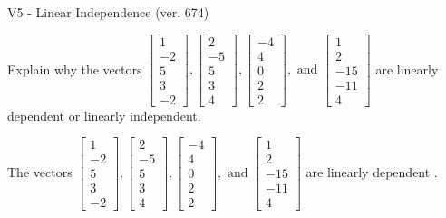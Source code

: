 \begin{exercise}
  \begin{exerciseTitle}V5 - Linear Independence (ver. 674)\end{exerciseTitle}
  \begin{exerciseStatement}
    Explain why the vectors \(\left[\begin{array}{r}
1 \\
-2 \\
5 \\
3 \\
-2
\end{array}\right] , \left[\begin{array}{r}
2 \\
-5 \\
5 \\
3 \\
4
\end{array}\right] , \left[\begin{array}{r}
-4 \\
4 \\
0 \\
2 \\
2
\end{array}\right] , \text{ and } \left[\begin{array}{r}
1 \\
2 \\
-15 \\
-11 \\
4
\end{array}\right]\) are linearly dependent or linearly independent.	


  \end{exerciseStatement}
  \begin{exerciseAnswer}
   The vectors \(\left[\begin{array}{r}
1 \\
-2 \\
5 \\
3 \\
-2
\end{array}\right] , \left[\begin{array}{r}
2 \\
-5 \\
5 \\
3 \\
4
\end{array}\right] , \left[\begin{array}{r}
-4 \\
4 \\
0 \\
2 \\
2
\end{array}\right] , \text{ and } \left[\begin{array}{r}
1 \\
2 \\
-15 \\
-11 \\
4
\end{array}\right]\) are 
  	 linearly dependent  .
  


  \end{exerciseAnswer}
\end{exercise}